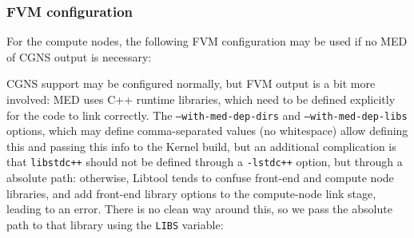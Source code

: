 \documentclass[a4paper,10pt,twoside]{article}
\begin{document}
\subsubsection{FVM configuration}

For the compute nodes, the following FVM configuration may be
used if no MED of CGNS output is necessary:


CGNS support may be configured normally, but FVM output is a bit more
involved: MED uses C++ runtime libraries, which need to be defined explicitly
for the code to link correctly. The \texttt{--with-med-dep-dirs}
and \texttt{--with-med-dep-libs} options, which may define comma-separated
values (no whitespace) allow defining this and passing this info to
the Kernel build, but an additional complication is that \texttt{libstdc++}
should not be defined through a \texttt{-lstdc++} option, but through
a absolute path: otherwise, Libtool tends to confuse front-end and compute
node libraries, and add front-end library options to the compute-node
link stage, leading to an error. There is no clean way around this,
so we pass the absolute path to that library using the \texttt{LIBS}
variable:
\end{document}
